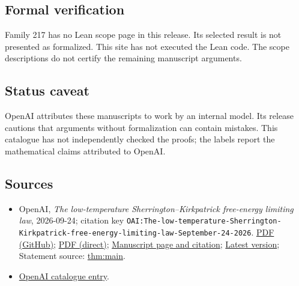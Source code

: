 \documentclass[11pt]{article}
\begin{document}
\subsection{Formal verification}
Family 217 has no Lean scope page in this release. Its selected result is not presented as formalized. This site has not executed the Lean code. The scope descriptions do not certify the remaining manuscript arguments.

\subsection{Status caveat}
OpenAI attributes these manuscripts to work by an internal model. Its release cautions that arguments without formalization can contain mistakes. This catalogue has not independently checked the proofs; the labels report the mathematical claims attributed to OpenAI.

\subsection{Sources}
\begin{itemize}
\item OpenAI, \emph{The low-temperature Sherrington–Kirkpatrick free-energy limiting law}, 2026-09-24; citation key \texttt{OAI:The-low-temperature-Sherrington-Kirkpatrick-free-energy-limiting-law-September-24-2026}. \href{https://github.com/openai/math/blob/adc7f1241b42e322a6451854ab7e4b4c146bf78a/preprints/The-low-temperature-Sherrington-Kirkpatrick-free-energy-limiting-law-September-24-2026/The-low-temperature-Sherrington-Kirkpatrick-free-energy-limiting-law-September-24-2026.pdf}{PDF (GitHub)}; \href{https://github.com/openai/math/raw/adc7f1241b42e322a6451854ab7e4b4c146bf78a/preprints/The-low-temperature-Sherrington-Kirkpatrick-free-energy-limiting-law-September-24-2026/The-low-temperature-Sherrington-Kirkpatrick-free-energy-limiting-law-September-24-2026.pdf}{PDF (direct)}; \href{https://github.com/openai/math/blob/adc7f1241b42e322a6451854ab7e4b4c146bf78a/preprints/The-low-temperature-Sherrington-Kirkpatrick-free-energy-limiting-law-September-24-2026/README.md}{Manuscript page and citation}; \href{https://github.com/openai/math/blob/main/preprints/The-low-temperature-Sherrington-Kirkpatrick-free-energy-limiting-law-September-24-2026/The-low-temperature-Sherrington-Kirkpatrick-free-energy-limiting-law-September-24-2026.pdf}{Latest version}; Statement source: \href{https://github.com/openai/math/blob/adc7f1241b42e322a6451854ab7e4b4c146bf78a/preprints/The-low-temperature-Sherrington-Kirkpatrick-free-energy-limiting-law-September-24-2026/build/sections/01-introduction.tex\#L89}{thm:main}.
\item \href{https://github.com/openai/math/blob/adc7f1241b42e322a6451854ab7e4b4c146bf78a/CONTENTS.md}{OpenAI catalogue entry}.
\end{itemize}
\end{document}
